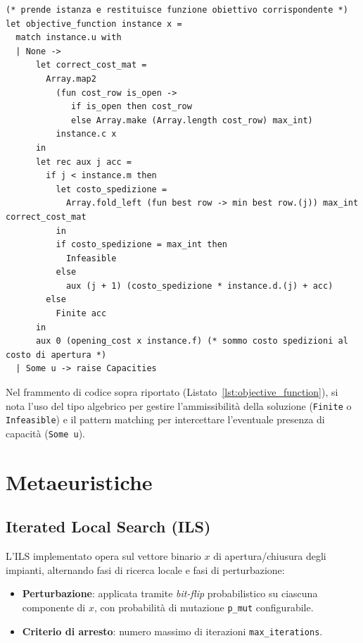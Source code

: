 \documentclass[11pt,a4paper]{article}
\begin{document}
\begin{lstlisting}[caption={Calcolo della funzione obiettivo per l'UFLP in OCaml.}, label={lst:objective_function}]
(* prende istanza e restituisce funzione obiettivo corrispondente *)
let objective_function instance x =
  match instance.u with
  | None ->
      let correct_cost_mat =
        Array.map2
          (fun cost_row is_open ->
             if is_open then cost_row
             else Array.make (Array.length cost_row) max_int)
          instance.c x
      in
      let rec aux j acc =
        if j < instance.m then
          let costo_spedizione =
            Array.fold_left (fun best row -> min best row.(j)) max_int correct_cost_mat
          in
          if costo_spedizione = max_int then
            Infeasible
          else
            aux (j + 1) (costo_spedizione * instance.d.(j) + acc)
        else
          Finite acc
      in
      aux 0 (opening_cost x instance.f) (* sommo costo spedizioni al costo di apertura *)
  | Some u -> raise Capacities
\end{lstlisting}

Nel frammento di codice sopra riportato (Listato~\ref{lst:objective_function}), si nota l'uso del tipo algebrico per gestire l'ammissibilità della soluzione (\texttt{Finite} o \texttt{Infeasible}) e il pattern matching per intercettare l'eventuale presenza di capacità (\texttt{Some u}).



\section{Metaeuristiche}

\subsection{Iterated Local Search (ILS)}

L'ILS implementato opera sul vettore binario $x$ di apertura/chiusura degli impianti, alternando fasi di ricerca locale e fasi di perturbazione:

\begin{itemize}
    \item \textbf{Perturbazione}: applicata tramite \emph{bit-flip} probabilistico su ciascuna componente di $x$, con probabilità di mutazione \verb|p_mut| configurabile.
    \item \textbf{Criterio di arresto}: numero massimo di iterazioni \verb|max_iterations|.
\end{itemize}
\end{document}

